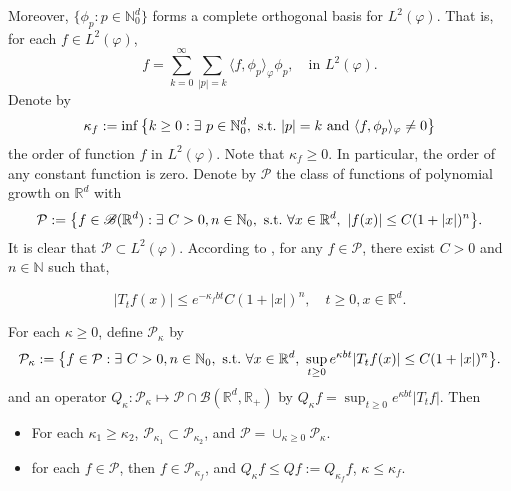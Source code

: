 \documentclass[12pt,oneside,english]{amsart}
\theoremstyle{plain}
\theoremstyle{definition}
\numberwithin{equation}{section}
\newcommand{\added}[1]{{\color{blue}#1}}\newcommand{\deleted}[1]{{\color{red}#1}}
\begin{document}
    Moreover, $\{\phi_p: p \in \mathbb N_0^d\}$ forms a complete orthogonal basis for $L^2(\varphi)$.
    That is, for each $f\in L^2(\varphi)$,
\begin{equation}\label{semicomp1}
    f
    =\sum_{k=0}^{\infty}\sum_{|p|=k}\langle f, \phi_p \rangle_{\varphi} \phi_p,
    \quad \text{in~} L^2(\varphi).
\end{equation}
    Denote by
\begin{equation}\label{order}
    \kappa_f
    :=\inf \left \{k\geq 0: \exists ~ p\in \mathbb N_0^d ,{\rm ~s.t.~}|p|=k {\rm ~and~}  \langle f, \phi_p \rangle_{\varphi}\neq 0\right \}
\end{equation}
    the order of function $f$ in $L^2(\varphi)$.
    Note that $ \kappa_f\geq 0$.
    In particular, the order of any constant function is zero.
    Denote by $\mathcal P$ the class of functions of polynomial growth on $\mathbb R^d$ with
\begin{equation}
    \mathcal{P}
    :=\big \{f\in \mathscr B(\mathbb{R}^d):\exists~ C>0, n \in \mathbb N_0, {\rm ~s.t.~} \forall x\in \mathbb{R}^d,~ |f(x)|\leq C(1+|x|)^n\big\}.
\end{equation}
    It is clear that $\mathcal{P} \subset L^2(\varphi)$.
    According to \cite[Fact 1.2]{MM}, for any $f \in \mathcal{P}$, there exist $C>0$  and $n\in \mathbb{N}$ such that,

\begin{equation}
\label{eq:semigroupineq}
    |T_tf(x)|
    \leq e^{-\kappa_f bt} C(1+|x|)^n,
    \quad t\geq 0, x\in \mathbb R^d.
\end{equation}
	\added{
	For each $\kappa\geq0$, define $\mathcal{P}_{\kappa}$ by 
	\begin{align}
	     \mathcal{P}_{\kappa}
    :=\big \{f\in \mathcal{P}:\exists~ C>0, n \in \mathbb N_0, {\rm ~s.t.~} \forall x\in \mathbb{R}^d,~ \sup_{t\geq0}e^{\kappa b t}|T_tf(x)|\leq C(1+|x|)^n\big\}.
	\end{align}
	and an operator $Q_{\kappa}:\mathcal{P}_{\kappa}\mapsto\mathcal{P}\cap\mathscr{B}(\mathbb{R}^d,\mathbb{R}_+)$ by $Q_{\kappa}f=\sup_{t\geq0}e^{\kappa b t}|T_tf|$.
	Then
	\begin{itemize}
	    \item For each $\kappa_1\geq \kappa_2$, $\mathcal{P}_{\kappa_1}\subset\mathcal{P}_{\kappa_2}$, and $\mathcal{P}=\cup_{\kappa\geq 0}\mathcal{P}_{\kappa}$.
	    \item for each $f\in \mathcal{P}$, then $f\in \mathcal{P}_{\kappa_f}$, and $Q_{\kappa}f\leq Qf:=Q_{\kappa_f}f$, $\kappa\leq \kappa_f$.

	\end{itemize}
	}
\end{document}
